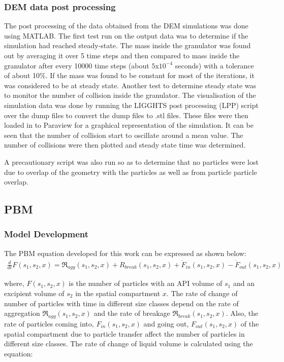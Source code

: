 \documentclass[preprint,11pt,authoryear]{elsarticle}
\begin{document}
\subsubsection{DEM data post processing}
\par The post processing of the data obtained from the DEM simulations was done using MATLAB. The first test run on the output data was to determine if the simulation had reached steady-state. The mass inside the granulator was found out by averaging it over 5 time steps and then compared to mass inside the granulator after every 10000 time steps (about $5$x$10^{-4}$ seconds) with a tolerance of about 10\%. If the mass was found to be constant for most of the iterations, it was considered to be at steady state. Another test to determine steady state was to monitor the number of collision inside the granulator. The visualisation of the simulation data was done by running the LIGGHTS post processing (LPP) script over the dump files to convert the dump files to .stl files. These files were then loaded in to Paraview\citep{henderson2004} for a graphical representation of the simulation. It can be seen that the number of collision start to oscillate around a mean value. The number of collisions were then plotted and steady state time was determined.
\par A precautionary script was also run so as to determine that no particles were lost due to overlap of the geometry with the particles as well as from particle particle overlap.


\subsection{PBM}
\subsubsection{Model Development}
\par The PBM equation developed for this work can be expressed as shown below:
\begin{align}
\frac{d}{dt}F(s_1,s_2,x)=\Re_{agg}(s_1,s_2,x)+R_{break}(s_1,s_2,x)+\dot{F}_{in}(s_1,s_2,x)-\dot{F}_{out}(s_1,s_2,x)
\label{eqn:mthds_pbm_overall} 
\end{align}

\par where, $F(s_1,s_2,x)$ is the number of particles with an API volume of $s_1$ and an excipient volume of $s_2$ in the spatial compartment $x$. The rate of change of number of particles with time in different size classes depend on the rate of aggregation $\Re_{agg}(s_1,s_2,x)$ and the rate of breakage $\Re_{break}(s_1,s_2,x)$. Also, the rate of particles coming into, $F_{in}(s_1,s_2,x)$ and going out, $F_{out}(s_1,s_2,x)$ of the spatial compartment due to particle transfer affect the number of particles in different size classes. 
The rate of change of liquid volume is calculated using the equation: 
\end{document}
